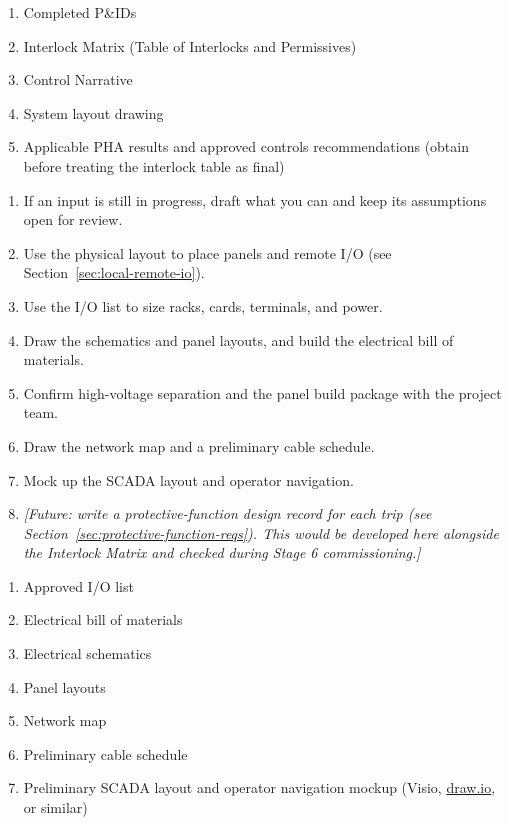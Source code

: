 \begin{enumerate}[itemsep=1pt]
  \item Completed P\&IDs
  \item Interlock Matrix (Table of Interlocks and Permissives)
  \item Control Narrative
  \item System layout drawing
  \item Applicable PHA results and approved controls recommendations (obtain before treating the interlock table as final)
\end{enumerate}

\begin{enumerate}[itemsep=1pt]
  \item If an input is still in progress, draft what you can and keep its assumptions open for review.
  \item Use the physical layout to place panels and remote I/O (see Section~\ref{sec:local-remote-io}).
  \item Use the I/O list to size racks, cards, terminals, and power.
  \item Draw the schematics and panel layouts, and build the electrical bill of materials.
  \item Confirm high-voltage separation and the panel build package with the project team.
  \item Draw the network map and a preliminary cable schedule.
  \item Mock up the SCADA layout and operator navigation.
  \item \textit{\textcolor{futureblue}{[Future: write a protective-function design record for each trip (see Section~\ref{sec:protective-function-reqs}). This would be developed here alongside the Interlock Matrix and checked during Stage 6 commissioning.]}}
\end{enumerate}

\begin{enumerate}[itemsep=1pt]
  \item Approved I/O list
  \item Electrical bill of materials
  \item Electrical schematics
  \item Panel layouts
  \item Network map
  \item Preliminary cable schedule
  \item Preliminary SCADA layout and operator navigation mockup (Visio, \href{https://www.drawio.com/}{draw.io}, or similar)
\end{enumerate}

